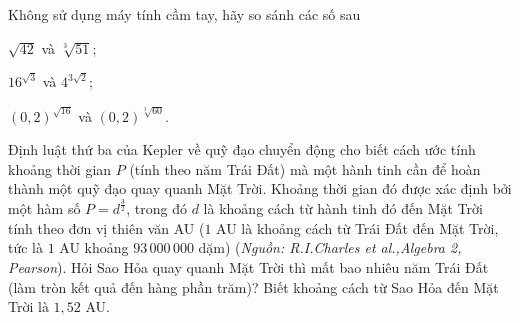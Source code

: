 \begin{bt}%
	Không sử dụng máy tính cầm tay, hãy so sánh các số sau
	\begin{listEX}[3]
		\item $\sqrt{42}$ và $\sqrt[3]{51}$;
		\item $16^{\sqrt{3}}$ và $4^{3\sqrt{2}}$;
		\item $(0{,}2)^{\sqrt{16}}$ và $(0{,}2)^{\sqrt[3]{60}}$.
	\end{listEX}
\end{bt}

\begin{bt}%
	Định luật thứ ba của Kepler về quỹ đạo chuyển động cho biết cách ước tính khoảng thời gian $P$ (tính theo năm Trái Đất) mà một hành tinh cần để hoàn thành một quỹ đạo quay quanh Mặt Trời. Khoảng thời gian đó được xác định bởi một hàm số $P=d^{\frac{3}{2}}$, trong đó $d$ là khoảng cách từ hành tinh đó đến Mặt Trời tính theo đơn vị thiên văn AU ($1$ AU là khoảng cách từ Trái Đất đến Mặt Trời, tức là $1$ AU khoảng $93\,000\,000$ dặm) (\textit{Nguồn: R.I.Charles et al.,Algebra 2, Pearson}). Hỏi Sao Hỏa quay quanh Mặt Trời thì mất bao nhiêu năm Trái Đất (làm tròn kết quả đến hàng phần trăm)? Biết khoảng cách từ Sao Hỏa đến Mặt Trời là $1{,}52$ AU.
\end{bt}

